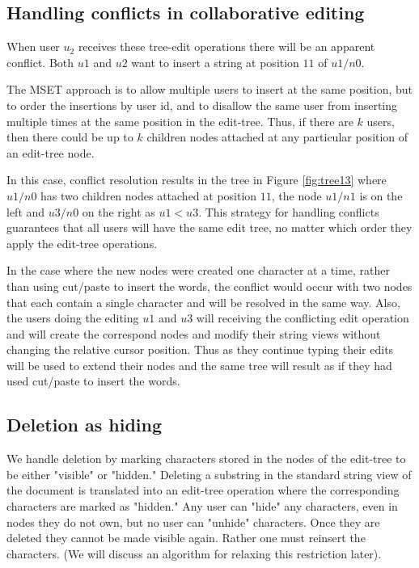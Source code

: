 \documentclass{amsart}
\begin{document}
\subsection{Handling conflicts in collaborative editing}
When user $u_2$ receives these tree-edit operations there will be an
apparent conflict. Both $u1$ and $u2$ want to insert a string at position
$11$ of $u1/n0$.  

The MSET approach is to allow multiple users to insert at
the same position, but to order the insertions by user id, and to disallow
the same user from inserting multiple times at the same position in the edit-tree.
Thus, if there are $k$ users, then there could be up to $k$ children nodes
attached at any particular position of an edit-tree node.

In this case, conflict resolution results in the tree in Figure
\ref{fig:tree13} where $u1/n0$ has two children nodes attached at position $11$,
the node $u1/n1$ is on the left and $u3/n0$ on the right as $u1<u3$.
This strategy for handling conflicts guarantees that all users will have
the same edit tree, no matter which order they apply the edit-tree operations.

In the case where the new nodes were created one character at a time, rather
than using cut/paste to insert the words, the conflict would occur with two
nodes that each contain a single character and will be resolved in the same
way.  Also, the users doing the editing $u1$ and $u3$ will receiving the
conflicting edit operation and will create the correspond nodes and modify
their string views without changing the relative cursor position. Thus as they
continue typing their edits will be used to extend their nodes and the
same tree will result as if they had used cut/paste to insert the words.


\subsection{Deletion as hiding}

We handle deletion by marking characters stored in the nodes of the edit-tree 
to be either "visible" or "hidden."  Deleting a substring in the standard string
view of the document is translated into an edit-tree operation where the
corresponding characters are marked as "hidden."  Any user can "hide" any
characters, even in nodes they do not own, but no user can "unhide" characters.
Once they are deleted they cannot be made visible again. Rather one must
reinsert the characters. (We will discuss an algorithm for relaxing this
restriction later).
\end{document}
